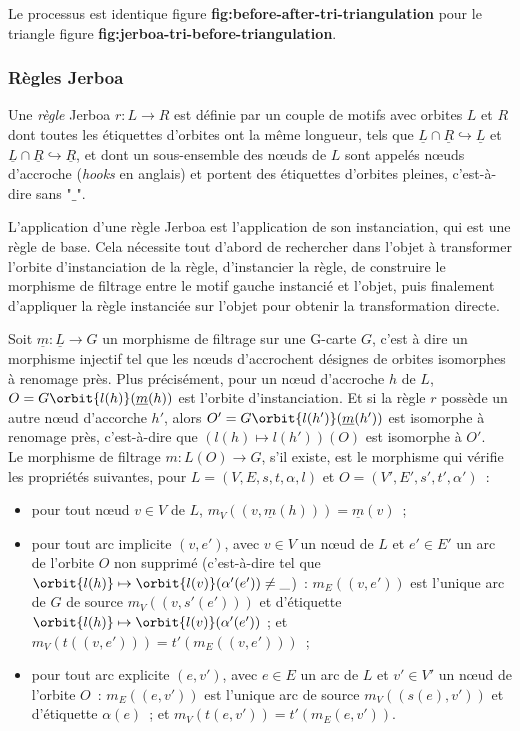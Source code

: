 Le processus est identique figure \textbf{fig:before-after-tri-triangulation} pour le triangle figure \textbf{fig:jerboa-tri-before-triangulation}.

\subsubsection[Règles Jerboa]{Règles Jerboa}
\label{sec:etat-art-jerboa-regles-jerboa}

Une \emph{règle} Jerboa $r: L \longrightarrow R$ est définie par un couple de motifs avec orbites $L$ et $R$ dont toutes les étiquettes d'orbites ont la même longueur, tels que $\underline{L} \cap \underline{R} \hookrightarrow \underline{L}$ et $\underline{L} \cap \underline{R} \hookrightarrow \underline{R}$, et dont un sous-ensemble des nœuds de $L$ sont appelés nœuds d'accroche (\emph{hooks} en anglais) et portent des étiquettes d'orbites pleines, c'est-à-dire sans "$\_$".

L'application d'une règle Jerboa est l'application de son instanciation, qui est une règle de base. Cela nécessite tout d'abord de rechercher dans l'objet à transformer l'orbite d'instanciation de la règle, d'instancier la règle, de construire le morphisme de filtrage entre le motif gauche instancié et l'objet, puis finalement d'appliquer la règle instanciée sur l'objet pour obtenir la transformation directe.

Soit $\underline{m} : \underline{L} \rightarrow G$ un morphisme de filtrage sur une G-carte $G$, c'est à dire un morphisme injectif tel que les nœuds d'accrochent désignes de orbites isomorphes à renomage près. Plus précisément,
pour un nœud d'accroche $h$ de $L$, $O = G\orbit{l(h)}(\underline{m}(h))$ est l'orbite d'instanciation. Et si la règle $r$ possède un autre nœud d'accorche $h'$, alors $O' = G\orbit{l(h')}(\underline{m}(h'))$ est isomorphe à renomage près, c'est-à-dire que $(l(h) \mapsto l(h'))(O)$ est isomorphe à $O'$.\\

Le morphisme de filtrage $m : L(O) \rightarrow G$, s'il existe, est le morphisme qui vérifie les propriétés suivantes, pour $L = (V, E, s, t, \alpha, l)$ et $O = (V', E', s', t', \alpha')$~:
\begin{itemize}
	\item pour tout nœud $v \in V$ de $L$, $m_V((v,\underline{m}(h))) = \underline{m}(v)$~;

	\item pour tout arc implicite $(v,e')$, avec $v \in V$ un nœud de $L$ et $e' \in E'$ un arc de l'orbite $O$ non supprimé (c'est-à-dire tel que $\orbit{l(h)} \mapsto \orbit{l(v)} (\alpha'(e')) \neq \_$)~: $m_E((v,e'))$ est l'unique arc de $G$ de source $m_V((v, s'(e')))$ et d'étiquette $\orbit{l(h)} \mapsto \orbit{l(v)}(\alpha'(e'))$ ; et $m_V(t((v, e'))) = t'(m_E((v,e')))$~;

	\item pour tout arc explicite $(e, v')$, avec $e \in E$ un arc de $L$ et $v' \in V'$ un nœud de l'orbite $O$~: $m_E((e, v'))$ est l'unique arc de source $m_V((s(e), v'))$ et d'étiquette $\alpha(e)$~; et $m_V(t(e,v')) = t'(m_E(e,v'))$.
\end{itemize}

